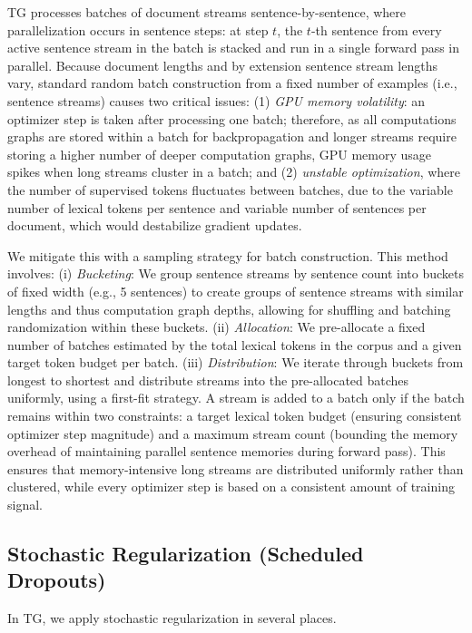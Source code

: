 \documentclass{article}
\begin{document}
TG processes batches of document streams sentence-by-sentence, where parallelization occurs in sentence steps: at step $t$, the $t$-th sentence from every active sentence stream in the batch is stacked and run in a single forward pass in parallel. Because document lengths and by extension sentence stream lengths vary, standard random batch construction from a fixed number of examples (i.e., sentence streams) causes two critical issues: (1) \emph{GPU memory volatility}: an optimizer step is taken after processing one batch; therefore, as all computations graphs are stored within a batch for backpropagation and longer streams require storing a higher number of deeper computation graphs, GPU memory usage spikes when long streams cluster in a batch; and (2) \emph{unstable optimization}, where the number of supervised tokens fluctuates between batches, due to the variable number of lexical tokens per sentence and variable number of sentences per document, which would destabilize gradient updates.

We mitigate this with a sampling strategy for batch construction. This method involves: (i) \emph{Bucketing}: We group sentence streams by sentence count into buckets of fixed width (e.g., 5 sentences) to create groups of sentence streams with similar lengths and thus computation graph depths, allowing for shuffling and batching randomization within these buckets. (ii) \emph{Allocation}: We pre-allocate a fixed number of batches estimated by the total lexical tokens in the corpus and a given target token budget per batch. (iii) \emph{Distribution}: We iterate through buckets from longest to shortest and distribute streams into the pre-allocated batches uniformly, using a first-fit strategy. A stream is added to a batch only if the batch remains within two constraints: a target lexical token budget (ensuring consistent optimizer step magnitude) and a maximum stream count (bounding the memory overhead of maintaining parallel sentence memories during forward pass). This ensures that memory-intensive long streams are distributed uniformly rather than clustered, while every optimizer step is based on a consistent amount of training signal.



\subsection{Stochastic Regularization (Scheduled Dropouts)}
\label{app:regularization}

In TG, we apply stochastic regularization in several places. 
\end{document}
